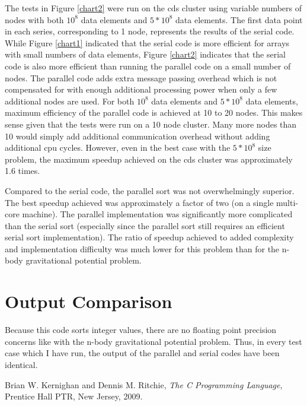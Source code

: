 \documentclass{article}
\begin{document}
The tests in Figure \ref{chart2} were run on the cds cluster using variable numbers of nodes with both \(10^8\) data elements and \(5*10^8\) data elements. The first data point in each series, corresponding to 1 node, represents the results of the serial code. While Figure \ref{chart1} indicated that the serial code is more efficient for arrays with small numbers of data elements, Figure \ref{chart2} indicates that the serial code is also more efficient than running the parallel code on a small number of nodes. The parallel code adds extra message passing overhead which is not compensated for with enough additional processing power when only a few additional nodes are used. For both \(10^8\) data elements and \(5*10^8\) data elements, maximum efficiency of the parallel code is achieved at 10 to 20 nodes. This makes sense given that the tests were run on a 10 node cluster. Many more nodes than 10 would simply add additional communication overhead without adding additional cpu cycles. However, even in the best case with the \(5*10^8\) size problem, the maximum speedup achieved on the cds cluster was approximately 1.6 times.

Compared to the serial code, the parallel sort was not overwhelmingly superior. The best speedup achieved was approximately a factor of two (on a single multi-core machine). The parallel implementation was significantly more complicated than the serial sort (especially since the parallel sort still requires an efficient serial sort implementation). The ratio of speedup achieved to added complexity and implementation difficulty was much lower for this problem than for the n-body gravitational potential problem.


\section{Output Comparison}
\label{outputcomp}

Because this code sorts integer values, there are no floating point precision concerns like with the n-body gravitational potential problem. Thus, in every test case which I have run, the output of the parallel and serial codes have been identical.

\begin{thebibliography}{9}

  Brian W. Kernighan and Dennis M. Ritchie,
  \emph{The C Programming Language},
  Prentice Hall PTR, New Jersey,
  2009.

\end{thebibliography}
\end{document}
